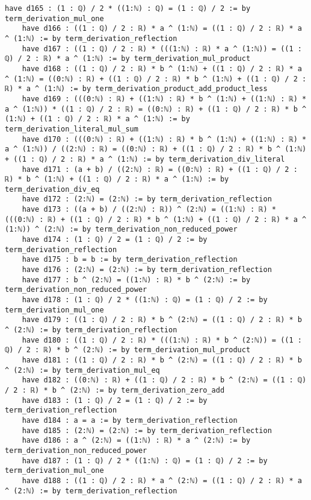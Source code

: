 \documentclass{article}
\begin{document}
\begin{tcolorbox}[colback=white!10, width=\linewidth]
\begin{lstlisting}[language=Lean4]
    have d165 : (1 : ℚ) / 2 * ((1:ℕ) : ℚ) = (1 : ℚ) / 2 := by term_derivation_mul_one
    have d166 : ((1 : ℚ) / 2 : ℝ) * a ^ (1:ℕ) = ((1 : ℚ) / 2 : ℝ) * a ^ (1:ℕ) := by term_derivation_reflection
    have d167 : ((1 : ℚ) / 2 : ℝ) * (((1:ℕ) : ℝ) * a ^ (1:ℕ)) = ((1 : ℚ) / 2 : ℝ) * a ^ (1:ℕ) := by term_derivation_mul_product
    have d168 : ((1 : ℚ) / 2 : ℝ) * b ^ (1:ℕ) + ((1 : ℚ) / 2 : ℝ) * a ^ (1:ℕ) = ((0:ℕ) : ℝ) + ((1 : ℚ) / 2 : ℝ) * b ^ (1:ℕ) + ((1 : ℚ) / 2 : ℝ) * a ^ (1:ℕ) := by term_derivation_product_add_product_less
    have d169 : (((0:ℕ) : ℝ) + ((1:ℕ) : ℝ) * b ^ (1:ℕ) + ((1:ℕ) : ℝ) * a ^ (1:ℕ)) * ((1 : ℚ) / 2 : ℝ) = ((0:ℕ) : ℝ) + ((1 : ℚ) / 2 : ℝ) * b ^ (1:ℕ) + ((1 : ℚ) / 2 : ℝ) * a ^ (1:ℕ) := by term_derivation_literal_mul_sum
    have d170 : (((0:ℕ) : ℝ) + ((1:ℕ) : ℝ) * b ^ (1:ℕ) + ((1:ℕ) : ℝ) * a ^ (1:ℕ)) / ((2:ℕ) : ℝ) = ((0:ℕ) : ℝ) + ((1 : ℚ) / 2 : ℝ) * b ^ (1:ℕ) + ((1 : ℚ) / 2 : ℝ) * a ^ (1:ℕ) := by term_derivation_div_literal
    have d171 : (a + b) / ((2:ℕ) : ℝ) = ((0:ℕ) : ℝ) + ((1 : ℚ) / 2 : ℝ) * b ^ (1:ℕ) + ((1 : ℚ) / 2 : ℝ) * a ^ (1:ℕ) := by term_derivation_div_eq
    have d172 : (2:ℕ) = (2:ℕ) := by term_derivation_reflection
    have d173 : ((a + b) / ((2:ℕ) : ℝ)) ^ (2:ℕ) = ((1:ℕ) : ℝ) * (((0:ℕ) : ℝ) + ((1 : ℚ) / 2 : ℝ) * b ^ (1:ℕ) + ((1 : ℚ) / 2 : ℝ) * a ^ (1:ℕ)) ^ (2:ℕ) := by term_derivation_non_reduced_power
    have d174 : (1 : ℚ) / 2 = (1 : ℚ) / 2 := by term_derivation_reflection
    have d175 : b = b := by term_derivation_reflection
    have d176 : (2:ℕ) = (2:ℕ) := by term_derivation_reflection
    have d177 : b ^ (2:ℕ) = ((1:ℕ) : ℝ) * b ^ (2:ℕ) := by term_derivation_non_reduced_power
    have d178 : (1 : ℚ) / 2 * ((1:ℕ) : ℚ) = (1 : ℚ) / 2 := by term_derivation_mul_one
    have d179 : ((1 : ℚ) / 2 : ℝ) * b ^ (2:ℕ) = ((1 : ℚ) / 2 : ℝ) * b ^ (2:ℕ) := by term_derivation_reflection
    have d180 : ((1 : ℚ) / 2 : ℝ) * (((1:ℕ) : ℝ) * b ^ (2:ℕ)) = ((1 : ℚ) / 2 : ℝ) * b ^ (2:ℕ) := by term_derivation_mul_product
    have d181 : ((1 : ℚ) / 2 : ℝ) * b ^ (2:ℕ) = ((1 : ℚ) / 2 : ℝ) * b ^ (2:ℕ) := by term_derivation_mul_eq
    have d182 : ((0:ℕ) : ℝ) + ((1 : ℚ) / 2 : ℝ) * b ^ (2:ℕ) = ((1 : ℚ) / 2 : ℝ) * b ^ (2:ℕ) := by term_derivation_zero_add
    have d183 : (1 : ℚ) / 2 = (1 : ℚ) / 2 := by term_derivation_reflection
    have d184 : a = a := by term_derivation_reflection
    have d185 : (2:ℕ) = (2:ℕ) := by term_derivation_reflection
    have d186 : a ^ (2:ℕ) = ((1:ℕ) : ℝ) * a ^ (2:ℕ) := by term_derivation_non_reduced_power
    have d187 : (1 : ℚ) / 2 * ((1:ℕ) : ℚ) = (1 : ℚ) / 2 := by term_derivation_mul_one
    have d188 : ((1 : ℚ) / 2 : ℝ) * a ^ (2:ℕ) = ((1 : ℚ) / 2 : ℝ) * a ^ (2:ℕ) := by term_derivation_reflection

\end{lstlisting}
\end{tcolorbox}
\end{document}
